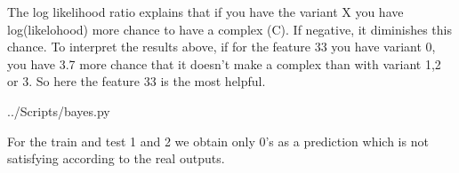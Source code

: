 \documentclass[10pt,a4paper]{article}
\begin{document}
\begin{enumerate}
The log likelihood ratio explains that if you have the variant X you have log(likelohood) more chance to have a complex (C). If negative, it diminishes this chance. To interpret the results above, if for the feature 33 you have variant 0, you have 3.7 more chance that it doesn't make a complex than with variant 1,2 or 3. So here the feature 33 is the most helpful.

 {../Scripts/bayes.py}

For the train and test 1 and 2 we obtain only 0's as a prediction which is not satisfying according to the real outputs. %

\end{enumerate}
\end{document}

